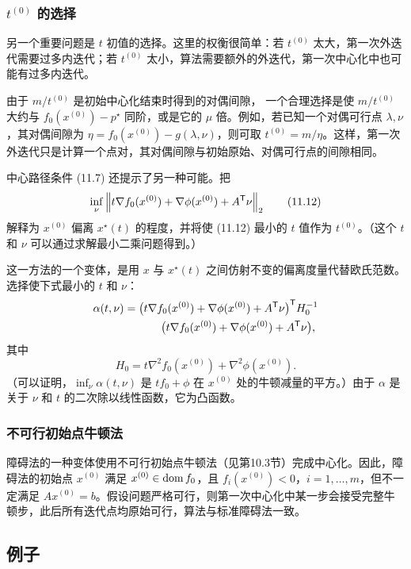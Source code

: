 \subsubsection*{$t^{(0)}$ 的选择}
另一个重要问题是 $t$ 初值的选择。这里的权衡很简单：若 $t^{(0)}$ 太大，第一次外迭代需要过多内迭代；若 $t^{(0)}$ 太小，算法需要额外的外迭代，第一次中心化中也可能有过多内迭代。

由于 $m/t^{(0)}$ 是初始中心化结束时得到的对偶间隙，
一个合理选择是使 $m/t^{(0)}$ 大约与 $f_0(x^{(0)})-p^\star$ 同阶，或是它的 $\mu$ 倍。例如，若已知一个对偶可行点 $\lambda,\nu$，其对偶间隙为 $\eta=f_0(x^{(0)})-g(\lambda,\nu)$，则可取 $t^{(0)}=m/\eta$。这样，第一次外迭代只是计算一个点对，其对偶间隙与初始原始、对偶可行点的间隙相同。

中心路径条件 (11.7) 还提示了另一种可能。把
\begin{equation}
\inf_\nu\left\lVert t\nabla f_0(x^{(0)})+\nabla\phi(x^{(0)})+A^\mathsf T\nu\right\rVert_2\tag{11.12}
\end{equation}
解释为 $x^{(0)}$ 偏离 $x^\star(t)$ 的程度，并将使 (11.12) 最小的 $t$ 值作为 $t^{(0)}$。（这个 $t$ 和 $\nu$ 可以通过求解最小二乘问题得到。）

这一方法的一个变体，是用 $x$ 与 $x^\star(t)$ 之间仿射不变的偏离度量代替欧氏范数。选择使下式最小的 $t$ 和 $\nu$：
\begin{align*}
\alpha(t,\nu)={}&\bigl(t\nabla f_0(x^{(0)})+\nabla\phi(x^{(0)})+A^\mathsf T\nu\bigr)^\mathsf T H_0^{-1}\\
&\qquad\bigl(t\nabla f_0(x^{(0)})+\nabla\phi(x^{(0)})+A^\mathsf T\nu\bigr),
\end{align*}
其中
\[
H_0=t\nabla^2 f_0(x^{(0)})+\nabla^2\phi(x^{(0)}).
\]
（可以证明，$\inf_\nu\alpha(t,\nu)$ 是 $tf_0+\phi$ 在 $x^{(0)}$ 处的牛顿减量的平方。）由于 $\alpha$ 是关于 $\nu$ 和 $t$ 的二次除以线性函数，它为凸函数。

\subsubsection*{不可行初始点牛顿法}
障碍法的一种变体使用不可行初始点牛顿法（见第10.3节）完成中心化。因此，障碍法的初始点 $x^{(0)}$ 满足 $x^{(0)}\in\operatorname{dom} f_0$，且 $f_i(x^{(0)})<0$，$i=1,\ldots,m$，但不一定满足 $Ax^{(0)}=b$。假设问题严格可行，则第一次中心化中某一步会接受完整牛顿步，此后所有迭代点均原始可行，算法与标准障碍法一致。

\subsection{例子}
